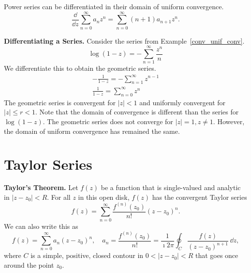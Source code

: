 \begin{Result}
  Power series can be differentiated in their domain of uniform convergence.
  \[ 
  \frac{\dd}{\dd z} \sum_{n = 0}^\infty a_n z^n = \sum_{n = 0}^\infty (n + 1) a_{n+1} z^n. 
  \]
\end{Result}








\begin{Example} \textbf{Differentiating a Series.}
  Consider the series from Example~\ref{conv_unif_conv}.
  \[ 
  \log(1 - z) = - \sum_{n=1}^\infty \frac{z^n}{n}
  \]
  We differentiate this to obtain the geometric series.
  \begin{gather*}
    - \frac{1}{1 - z} = - \sum_{n=1}^\infty z^{n-1} 
    \\
    \frac{1}{1 - z} = \sum_{n = 0}^\infty z^n
  \end{gather*}
  The geometric series is convergent for  
  $|z| < 1$ and uniformly convergent for $|z| \leq r < 1$.  Note that the 
  domain of convergence is different than the series for $\log(1 - z)$.
  The geometric series does not converge for $|z| = 1, z \neq 1$. 
  However, the domain of uniform convergence has remained the same.
\end{Example}









\section{Taylor Series}



\begin{Result}
  \label{result taylor theorem}
  \textbf{Taylor's Theorem.}
  Let $f(z)$ be a function that is single-valued and analytic in 
  $|z - z_0| < R$.  For all $z$ in this open disk, $f(z)$ has the 
  convergent Taylor series
  \begin{equation}
    \label{eqn_taylors_theorem1} 
    f(z) = \sum_{n = 0}^\infty \frac{f^{(n)}(z_0)}{n!} (z - z_0)^n.
  \end{equation}
  We can also write this as 
  \begin{equation}
    \label{eqn_taylors_theorem2}
    f(z) = \sum_{n = 0}^\infty a_n (z - z_0)^n, \quad 
    a_n = \frac{ f^{(n)}(z_0) }{ n! }
    = \frac{ 1 }{ \imath 2 \pi } \oint_C \frac{ f(z) }{ (z - z_0)^{n+1} } \,\dd z,
  \end{equation}
  where $C$ is a simple, positive, closed contour in $0 < |z - z_0| < R$ 
  that goes once around the point $z_0$.
\end{Result}





